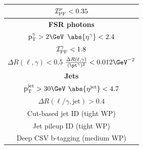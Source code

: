 \begin{table}[H]
\begin{tabular}{|c|c|}
		\multicolumn{2}{|c|}{$\ensuremath{{\cal I}_{\mathrm{PF}}^{\mu}} < 0.35$}                                                                                                                                           \\ \hline \hline
		\multicolumn{2}{|c|}{\textbf{FSR photons}}                                                                                                                                                                                  \\ \hline
		\multicolumn{2}{|c|}{$\mathrm{p_T^{\gamma}} > 2 \GeV$ \hspace{0.5cm} $\abs{\eta^{\gamma}} < 2.4$}                                                                                                                                 \\
		\multicolumn{2}{|c|}{$\ensuremath{{\cal I}_{\mathrm{PF}}^{\gamma}} < 1.8$}                                                                                                                                         \\
		\multicolumn{2}{|c|}{$\Delta R(\ell,\gamma) < 0.5$ \hspace{0.5cm} $\frac{\Delta R(\ell,\gamma)}{(\pt^{\gamma})^2} < 0.012 \GeV^{-2}$}                                                                                             \\ \hline \hline
		\multicolumn{2}{|c|}{\textbf{Jets}}                                                                                                                                                                                         \\ \hline
		\multicolumn{2}{|c|}{$\mathrm{p_T^{\mathrm{jet}}} > 30 \GeV$ \hspace{0.5cm} $\abs{\eta^{\mathrm{jet}}} < 4.7$}                                                                                                                    \\
		\multicolumn{2}{|c|}{$\Delta R(\ell/\gamma, \mathrm{jet}) > 0.4$} \\
                \multicolumn{2}{|c|}{Cut-based jet ID (tight WP) } \\
                \multicolumn{2}{|c|}{Jet pileup ID (tight WP)} \\
                \multicolumn{2}{|c|}{Deep CSV b-tagging (medium WP)} \\
                \hline \hline

\end{tabular}
\end{table}
